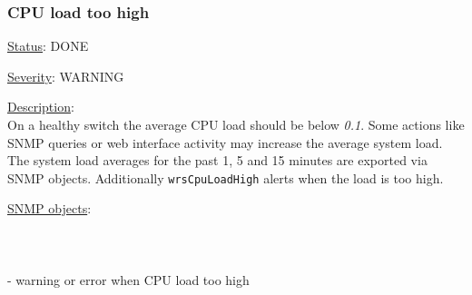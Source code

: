 \subsubsection{\bf CPU load too high}
		\label{fail:other:cpu}
		\begin{pck_descr}
			\item [] \underline{Status}: DONE
			\item [] \underline{Severity}: WARNING
			\item [] \underline{Description}:\\
				On a healthy switch the average CPU load should be below \emph{0.1}.
				Some actions like SNMP queries or web interface activity may increase
				the average system load. The system load averages for the past 1, 5 and
				15 minutes are exported via SNMP objects. Additionally
				\texttt{wrsCpuLoadHigh} alerts when the load is too high.
			\item [] \underline{SNMP objects}:\\
				\\
				\\
				\\
				 - warning or error when CPU load too high\\
				\\
		\end{pck_descr}

